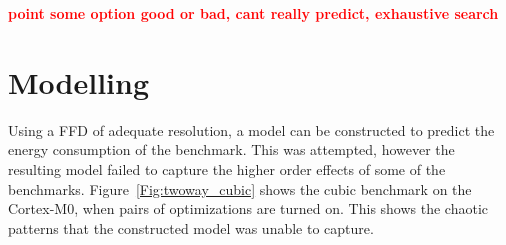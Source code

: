 \documentclass[twocolumn]{article}
\newcommand{\nsection}[1]{\section{\bfseries #1}}
\newcommand{\todo}[1]{\textbf{\textcolor{red}{#1}}}
\let\oldcaption\caption
\renewcommand{\caption}[1]{\oldcaption{\textup{#1}}}
\begin{document}
\todo{point some option good or bad, cant really predict, exhaustive search}

\nsection{Modelling}

Using a FFD of adequate resolution, a model can be constructed to predict the energy consumption of the benchmark. This was attempted, however the resulting model failed to capture the higher order effects of some of the benchmarks. Figure~\ref{Fig:twoway_cubic} shows the cubic benchmark on the Cortex-M0, when pairs of optimizations are turned on. This shows the chaotic patterns that the constructed model was unable to capture.

\end{document}
